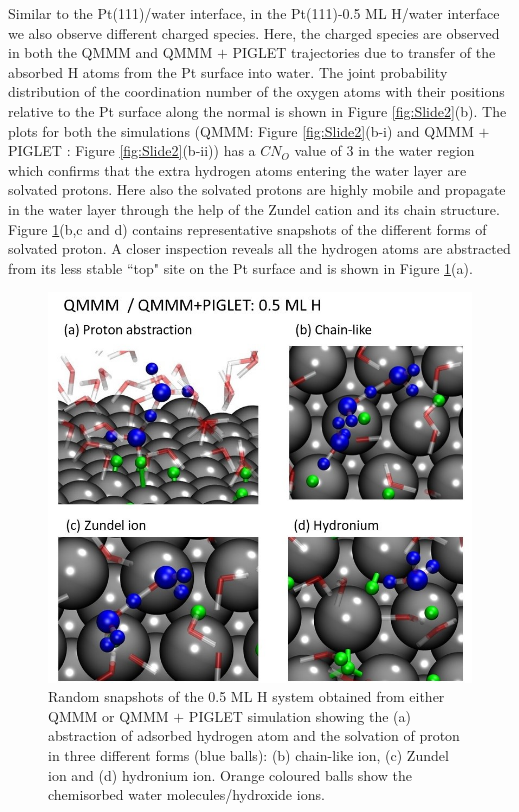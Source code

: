 Similar to the Pt(111)/water interface, in the Pt(111)-0.5 ML H/water
interface we also observe different charged species. Here, the charged
species are observed in both the QMMM and QMMM $+$ PIGLET trajectories due
to transfer of the absorbed H atoms from the Pt surface into water. The joint probability distribution of the coordination number of the oxygen atoms with their positions relative to the Pt surface along the normal is shown in Figure \ref{fig:Slide2}(b). The plots for both the simulations (QMMM: Figure \ref{fig:Slide2}(b-i) and QMMM $+$ PIGLET : Figure \ref{fig:Slide2}(b-ii)) has a $CN_O$ value of 3 in the water region which confirms that the extra hydrogen atoms entering the water layer are solvated protons. Here also the solvated protons are highly mobile and propagate in the water layer through the help of the Zundel cation and its chain structure. Figure \ref{fig:Slide10}(b,c and d) contains representative snapshots of the different forms of solvated proton. A closer inspection reveals all the hydrogen atoms are abstracted from its less stable ``top" site on the Pt surface and is shown in Figure \ref{fig:Slide10}(a). 

\begin{figure}
   \begin{center}
    \includegraphics[width=15cm]{./Chapter3/figures/slide10.JPG}       
   \end{center}
    \caption{Random snapshots of the 0.5 ML H system obtained from either QMMM or QMMM $+$ PIGLET simulation showing the (a) abstraction of adsorbed hydrogen atom  and the solvation of proton in three different forms (blue balls): (b) chain-like ion, (c) Zundel ion and (d) hydronium ion. Orange coloured balls show the chemisorbed water molecules/hydroxide ions. }
  \label{fig:Slide10}
\end{figure}

